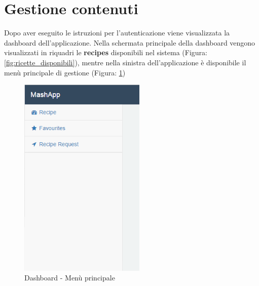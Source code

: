 %


\section{Gestione contenuti} %
\label{sec:gestione_contenuti}
	Dopo aver eseguito le istruzioni per l'autenticazione\gloss{} viene visualizzata la dashboard\gloss{} dell’applicazione.\newline
	Nella schermata principale della dashboard\gloss{} vengono visualizzati in riquadri le \textbf{recipes}\gloss{} disponibili nel sistema (Figura: \ref{fig:ricette_disponibili}), mentre nella sinistra dell'applicazione è disponibile il menù principale di gestione (Figura: \ref{fig:menu_principale_utente})
	\begin{figure}[H]
		\centering
		\centerline{\includegraphics[width=6cm]{images/menu_principale_utente.png}}
		\caption{Dashboard - Menù principale}
		\label{fig:menu_principale_utente}
	\end{figure}




